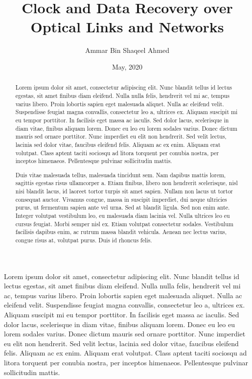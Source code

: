 \documentclass[oneside]{discothesis}
\title{Clock and Data Recovery over Optical Links and Networks}
\author{Ammar Bin Shaqeel Ahmed}
\institute{University College London}
\date{May, 2020}
\begin{document}
\frontmatter %
\maketitle
\cleardoublepage

\begin{acknowledgements}
 Lorem ipsum dolor sit amet, consectetur adipiscing elit. Nunc blandit tellus
 id lectus egestas, sit amet finibus diam eleifend. Nulla nulla felis,
 hendrerit vel mi ac, tempus varius libero. Proin lobortis sapien eget
 malesuada aliquet. Nulla ac eleifend velit. Suspendisse feugiat magna
 convallis, consectetur leo a, ultrices ex. Aliquam suscipit mi eu tempor
 porttitor. In facilisis eget massa ac iaculis. Sed dolor lacus, scelerisque in
 diam vitae, finibus aliquam lorem. Donec eu leo eu lorem sodales varius. Donec
 dictum mauris sed ornare porttitor. Nunc imperdiet eu elit non hendrerit. Sed
 velit lectus, lacinia sed dolor vitae, faucibus eleifend felis. Aliquam ac ex
 enim. Aliquam erat volutpat. Class aptent taciti sociosqu ad litora torquent
 per conubia nostra, per inceptos himenaeos. Pellentesque pulvinar sollicitudin
 mattis.
\end{acknowledgements}

\begin{abstract}
 Lorem ipsum dolor sit amet, consectetur adipiscing elit. Nunc blandit tellus
 id lectus egestas, sit amet finibus diam eleifend. Nulla nulla felis,
 hendrerit vel mi ac, tempus varius libero. Proin lobortis sapien eget
 malesuada aliquet. Nulla ac eleifend velit. Suspendisse feugiat magna
 convallis, consectetur leo a, ultrices ex. Aliquam suscipit mi eu tempor
 porttitor. In facilisis eget massa ac iaculis. Sed dolor lacus, scelerisque in
 diam vitae, finibus aliquam lorem. Donec eu leo eu lorem sodales varius. Donec
 dictum mauris sed ornare porttitor. Nunc imperdiet eu elit non hendrerit. Sed
 velit lectus, lacinia sed dolor vitae, faucibus eleifend felis. Aliquam ac ex
 enim. Aliquam erat volutpat. Class aptent taciti sociosqu ad litora torquent
 per conubia nostra, per inceptos himenaeos. Pellentesque pulvinar sollicitudin
 mattis.

Duis vitae malesuada tellus, malesuada tincidunt sem. Nam dapibus mattis lorem,
sagittis egestas risus ullamcorper a. Etiam finibus, libero non hendrerit
scelerisque, nisl nisi blandit lacus, id laoreet tortor turpis sit amet sapien.
Nullam non lacus ut tortor consequat auctor. Vivamus congue, massa in suscipit
imperdiet, dui neque ultricies purus, ut fermentum sapien ante vel urna. Sed at
blandit ligula. Sed non enim ante. Integer volutpat vestibulum leo, eu
malesuada diam lacinia vel. Nulla ultrices leo eu cursus feugiat. Morbi semper
nisl ex. Etiam volutpat consectetur sodales. Vestibulum facilisis dapibus enim,
ac rutrum massa blandit vehicula. Aenean nec lectus varius, congue risus at,
volutpat purus. Duis id rhoncus felis. 
\end{abstract}
\end{document}
